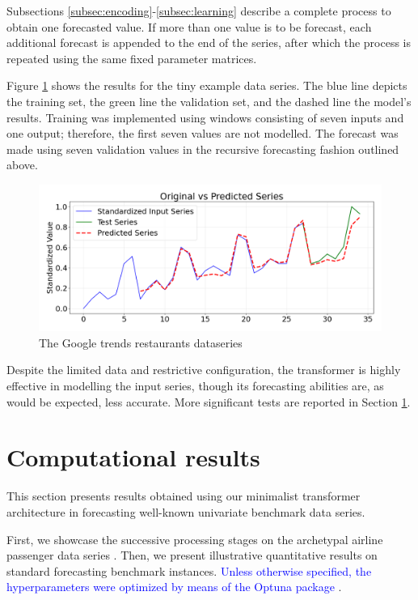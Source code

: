 \documentclass[algorithms,article,submit,pdftex,moreauthors]{Definitions/mdpi}
\begin{document}
Subsections \ref{subsec:encoding}-\ref{subsec:learning} describe a complete process to obtain one forecasted value. If more than one value is to be forecast, each additional forecast is appended to the end of the series, after which the process is repeated using the same fixed parameter matrices.

Figure \ref{fig:restaurants} shows the results for the tiny example data series. The blue line depicts the training set, the green line the validation set, and the dashed line the model's results. Training was implemented using windows consisting of seven inputs and one output; therefore, the first seven values are not modelled. The forecast was made using seven validation values in the recursive forecasting fashion outlined above.

\begin{figure}
    \centering
    \includegraphics[width=1.0\linewidth]{restaurants.png}
    \caption{The Google trends restaurants dataseries}
    \label{fig:restaurants}
\end{figure}

Despite the limited data and restrictive configuration, the transformer is highly effective in modelling the input series, though its forecasting abilities are, as would be expected, less accurate. More significant tests are reported in Section \ref{sec:results}.

\section{Computational results} \label{sec:results}

This section presents results obtained using our minimalist transformer architecture in forecasting well-known univariate benchmark data series.

First, we showcase the successive processing stages on the archetypal airline passenger data series \citep{BJ70}. Then, we present illustrative quantitative results on standard forecasting benchmark instances. \textcolor{blue}{Unless otherwise specified, the hyperparameters were optimized by means of the Optuna package \cite{ASY19}}.
\end{document}
